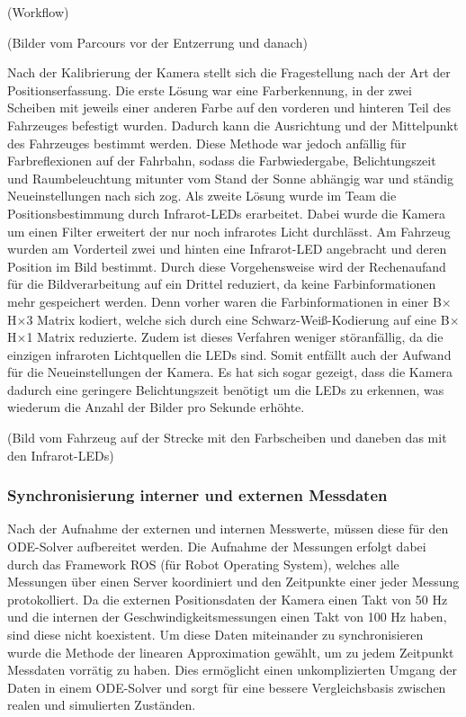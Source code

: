 (Workflow)    

(Bilder vom Parcours vor der Entzerrung und danach)

Nach der Kalibrierung der Kamera stellt sich die Fragestellung nach der Art der Positionserfassung. Die erste Lösung war eine Farberkennung, in der zwei Scheiben mit jeweils einer anderen Farbe auf den vorderen und hinteren Teil des Fahrzeuges befestigt wurden. Dadurch kann die Ausrichtung und der Mittelpunkt des Fahrzeuges bestimmt werden. Diese Methode war jedoch anfällig für Farbreflexionen auf der Fahrbahn, sodass die Farbwiedergabe, Belichtungszeit und Raumbeleuchtung mitunter vom Stand der Sonne abhängig war und ständig Neueinstellungen nach sich zog. Als zweite Lösung wurde im Team die Positionsbestimmung durch Infrarot-LEDs erarbeitet. Dabei wurde die Kamera um einen Filter erweitert der nur noch infrarotes Licht durchlässt. Am Fahrzeug wurden am Vorderteil zwei und hinten eine Infrarot-LED angebracht und deren Position im Bild bestimmt. Durch diese Vorgehensweise wird der Rechenaufand für die Bildverarbeitung auf ein Drittel reduziert, da keine Farbinformationen mehr gespeichert werden. Denn vorher waren die Farbinformationen in einer B$\times$H$\times$3 Matrix kodiert, welche sich durch eine Schwarz-Weiß-Kodierung auf eine B$\times$H$\times$1 Matrix reduzierte. Zudem ist dieses Verfahren weniger störanfällig, da die einzigen infraroten Lichtquellen die LEDs sind. Somit entfällt auch der Aufwand für die Neueinstellungen der Kamera. Es hat sich sogar gezeigt, dass die Kamera dadurch eine geringere Belichtungszeit benötigt um die LEDs zu erkennen, was wiederum die Anzahl der Bilder pro Sekunde erhöhte.  

(Bild vom Fahrzeug auf der Strecke mit den Farbscheiben und daneben das mit den Infrarot-LEDs)  

\subsubsection{Synchronisierung interner und externen Messdaten}
Nach der Aufnahme der externen und internen Messwerte, müssen diese für den ODE-Solver aufbereitet werden. Die Aufnahme der Messungen erfolgt dabei durch das Framework ROS (für Robot Operating System), welches alle Messungen über einen Server koordiniert und den Zeitpunkte einer jeder Messung protokolliert. Da die externen Positionsdaten der Kamera einen Takt von 50 Hz und die internen der Geschwindigkeitsmessungen einen Takt von 100 Hz haben, sind diese nicht koexistent. Um diese Daten miteinander zu synchronisieren wurde die Methode der linearen Approximation gewählt, um zu jedem Zeitpunkt Messdaten vorrätig zu haben. Dies ermöglicht einen unkomplizierten Umgang der Daten in einem ODE-Solver und sorgt für eine bessere Vergleichsbasis zwischen realen und simulierten Zuständen. 

